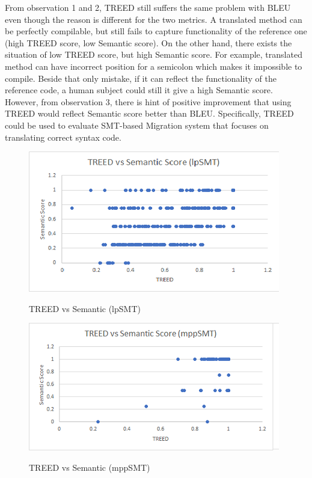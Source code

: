 From observation 1 and 2, TREED still suffers the same problem with BLEU even though the reason is different for the two metrics. A translated method can be perfectly compilable, but still fails to capture functionality of the reference one (high TREED score, low Semantic score). On the other hand, there exists the situation of low TREED score, but high Semantic score. For example, translated method can have incorrect position for a semicolon which makes it impossible to compile. Beside that only mistake, if it can reflect the functionality of the reference code, a human subject could still it give a high Semantic score. However, from observation 3, there is hint of positive improvement that using TREED would reflect Semantic score better than BLEU. Specifically, TREED could be used to evaluate SMT-based Migration system that focuses on translating correct syntax code. 

 
\begin{figure}
\caption{TREED vs Semantic (lpSMT)}
\centering
\includegraphics{img/treed_lpSMT.png}
\label{fig:TREEDlpSMT}
\end{figure}

\begin{figure}
\caption{TREED vs Semantic (mppSMT)}
\centering
\includegraphics{img/treed_mppSMT.png}
\label{fig:TREEDmppSMT}
\end{figure}

